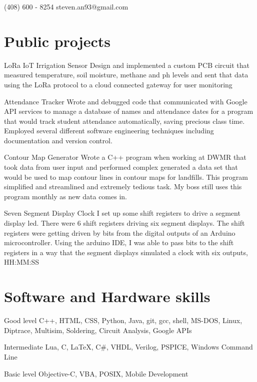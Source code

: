 \documentclass{tccv}
\begin{document}
    {(408) 600 - 8254}
    {steven.an93@gmail.com}

\section{Public projects}

\begin{yearlist}

\item{}
     {LoRa IoT Irrigation Sensor}
     {Design and implemented a custom PCB circuit that measured temperature, soil moisture, methane and ph levels and sent that data using the LoRa protocol to a cloud connected gateway for user monitoring}
     
\item{} 
     {Attendance Tracker}
     {Wrote and debugged code that communicated with Google API services to manage a database of names and attendance
     dates for a program that would track student attendance automatically, saving precious class time. Employed several different software engineering techniques including documentation and version control.}

\item{}
    {Contour Map Generator}
    {Wrote a C++ program when working at DWMR that took data from user input and performed complex generated a data set that would be used to map contour lines in contour maps for landfills. This program simplified and streamlined and extremely tedious task. My boss still uses this program monthly as new data comes in. }
    
\item{}
    {Seven Segment Display Clock}
    {I set up some shift registers to drive a segment display led. There were 6 shift registers driving six segment displays. The shift registers were getting driven by bits from the digital outputs of an Arduino microcontroller. Using the arduino IDE, I was able to pass bits to the shift registers in a way that the segment displays simulated a clock with six outputs, HH:MM:SS}
\end{yearlist}

\section{Software and Hardware skills}

\begin{factlist}

\item{Good level}
     {C++, HTML, CSS, Python, Java, git, gcc, shell,
      MS-DOS, Linux, Diptrace, Multisim, Soldering, Circuit Analysis, Google APIs}

\item{Intermediate}
     {Lua, C, \LaTeX, C#, VHDL, Verilog, PSPICE, Windows Command Line}

\item{Basic level}
     {Objective-C, VBA, POSIX, Mobile Development}

\end{factlist}
\end{document}
